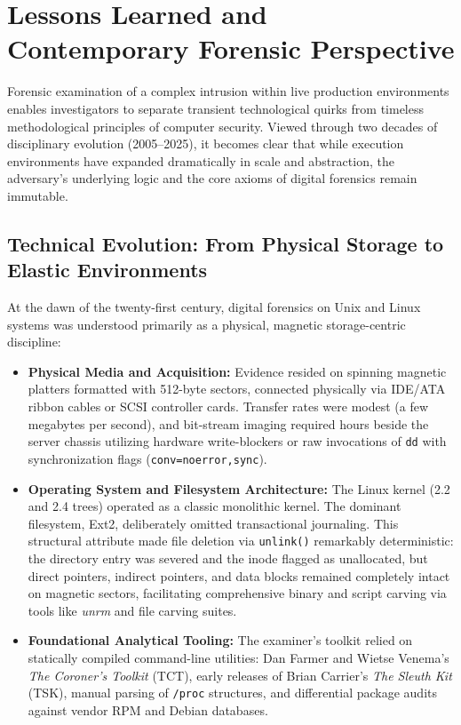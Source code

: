 \chapter{Lessons Learned and Contemporary Forensic Perspective}
\label{cap:retrospectiva_20_anios}

Forensic examination of a complex intrusion within live production environments enables investigators to separate transient technological quirks from timeless methodological principles of computer security. Viewed through two decades of disciplinary evolution (2005--2025), it becomes clear that while execution environments have expanded dramatically in scale and abstraction, the adversary's underlying logic and the core axioms of digital forensics remain immutable.

\section{Technical Evolution: From Physical Storage to Elastic Environments}

At the dawn of the twenty-first century, digital forensics on Unix and Linux systems was understood primarily as a physical, magnetic storage-centric discipline:
\begin{itemize}
    \item \textbf{Physical Media and Acquisition:} Evidence resided on spinning magnetic platters formatted with 512-byte sectors, connected physically via IDE/ATA ribbon cables or SCSI controller cards. Transfer rates were modest (a few megabytes per second), and bit-stream imaging required hours beside the server chassis utilizing hardware write-blockers or raw invocations of \texttt{dd} with synchronization flags (\texttt{conv=noerror,sync}).
    \item \textbf{Operating System and Filesystem Architecture:} The Linux kernel (2.2 and 2.4 trees) operated as a classic monolithic kernel. The dominant filesystem, Ext2, deliberately omitted transactional journaling. This structural attribute made file deletion via \texttt{unlink()} remarkably deterministic: the directory entry was severed and the inode flagged as unallocated, but direct pointers, indirect pointers, and data blocks remained completely intact on magnetic sectors, facilitating comprehensive binary and script carving via tools like \textit{unrm} and file carving suites.
    \item \textbf{Foundational Analytical Tooling:} The examiner's toolkit relied on statically compiled command-line utilities: Dan Farmer and Wietse Venema's \textit{The Coroner's Toolkit} (TCT), early releases of Brian Carrier's \textit{The Sleuth Kit} (TSK), manual parsing of \texttt{/proc} structures, and differential package audits against vendor RPM and Debian databases.
\end{itemize}

